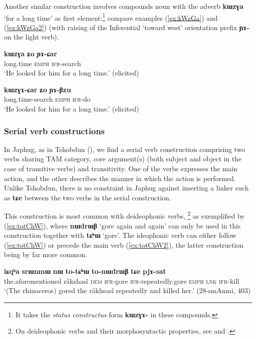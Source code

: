 \documentclass[oneside,a4paper,11pt]{article}
\newcommand{\ipa}[1]{\textbf{\phon#1}} %
\newcommand{\jpg}[2]{\ipa{#1} `#2'} %
\newcommand{\refb}[1]{(\ref{#1})}
\begin{document}
Another similar construction involves compounds noun with the adverb \jpg{kɯzɣa}{for a long time} as first element:\footnote{It takes the \textit{status constructus} form \ipa{kɯzɣɤ-} in these compounds.} compare examples \refb{ex:kWzGa} and \refb{ex:kWzGa2} (with raising of the Inferential `toward west' orientation prefix \ipa{ɲɤ-} on the light verb).

\begin{exe}
\ex \label{ex:kWzGa}
\gll 
\ipa{kɯzɣa} 	\ipa{ʑo} 	\ipa{ɲɤ-ɕar} \\
long.time \textsc{emph} \textsc{ifr}-search \\
\glt `He looked for him for a long time.' (elicited)
\end{exe}

\begin{exe}
\ex \label{ex:kWzGa2}
\gll 
\ipa{kɯzɣɤ-ɕar} 	\ipa{ʑo} 	\ipa{ɲɤ-βzu} \\
long.time-search \textsc{emph} \textsc{ifr}-do \\
\glt `He looked for him for a long time.' (elicited)
\end{exe}

\subsubsection{Serial verb constructions} \label{sec:serial}
In Japhug, as in Tshobdun (\citealt[490-1]{sun12complementation}), we find a serial verb construction comprising two verbs sharing TAM category, core argument(s) (both subject and object in the case of transitive verbs) and transitivity. One of the verbs expresses the main action, and the other describes the manner in which the action is performed. Unlike Tshobdun, there is no constraint in Japhug against inserting a linker such as \ipa{tɕe} between the two verbs in the serial construction.

This construction is most common with deideophonic verbs, \footnote{On deideophonic verbs and their morphosyntactic properties, see \citet{jackson04zhuangmaoci} and \citet{japhug14ideophones}.} as exemplified by (\ref{ex:totChW}), where \jpg{nɯdrɯβ}{gore again and again} can only be used in this construction together with \jpg{tɕʰɯ}{gore}. The ideophonic verb can either follow (\ref{ex:totChW}) or precede  the main verb (\ref{ex:totChW2}), the latter construction being by far more common.

\begin{exe}
\ex \label{ex:totChW}
\gll \ipa{iɕqʰa} 	\ipa{srɯnmɯ} 	\ipa{nɯ} 	\ipa{to-tɕʰɯ} 	\ipa{to-nɯdrɯβ}  \ipa{tɕe} 	\ipa{pjɤ-sat} \\
the.aforementioned râkshasî \textsc{dem} \textsc{ifr}-gore \textsc{ifr}-repeatedly.gore \textsc{emph} \textsc{lnk} \textsc{ifr}-kill \\
\glt `(The rhinoceros) gored the râkhsasî repeatedly and killed her.' (28-smAnmi, 403)
\end{exe}
\end{document}
